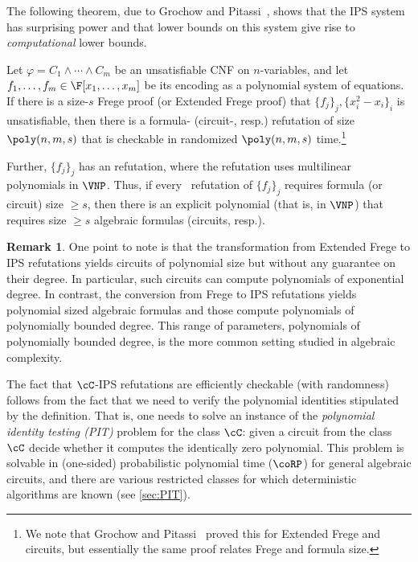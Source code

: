 \documentclass[11pt]{article}
\numberwithin{equation}{section}
\theoremstyle{definition}
\newtheorem{remark}[theorem]{Remark}
\theoremstyle{plain}
\begin{document}
The following theorem, due to Grochow and Pitassi~\cite{Pitassi97,DBLP:journals/jacm/GrochowP18}, shows that the IPS system has surprising power and that lower bounds on this system give rise to \emph{computational} lower bounds.

\begin{theoremwp}\label{thm:DBLP:journals/jacm/GrochowP18}
        Let $\varphi=C_1\wedge\cdots\wedge C_m$ be an unsatisfiable CNF on $n$-variables, and let $f_1,\ldots,f_m\in\F[x_1,\ldots,x_m]$ be its encoding as a polynomial system of equations. If there is a size-$s$ Frege proof
%
(or Extended Frege proof) %
that $\{f_j\}_j,\{x_i^2-x_i\}_i$ is unsatisfiable, then there is a formula-\lIPS
%
(circuit-\lIPS, resp.)   %
refutation of size $\poly(n,m,s)$ that is checkable in randomized $\poly(n,m,s)$ time.\footnote{We note that Grochow and Pitassi~\cite{DBLP:journals/jacm/GrochowP18} proved this for Extended Frege and circuits, but essentially the same proof relates Frege and formula size.}

        Further, $\{f_j\}_j$ has an \lIPS refutation, where the refutation uses multilinear polynomials in $\VNP$.  Thus, if every \IPS\ refutation of $\{f_j\}_j$ requires formula
%
%
(or circuit) %
 size $\ge s$, then there is an explicit polynomial (that is, in $\VNP$) that requires size $\ge s$ algebraic formulas %
(circuits, resp.).  %
\end{theoremwp}
%
%
%
%

\begin{remark}\label{rmk:EF-degree}
        One point to note is that the transformation from Extended Frege to IPS refutations yields circuits of polynomial size but without any guarantee on their degree. In particular, such circuits can compute polynomials of exponential degree. In contrast, the conversion from Frege to IPS refutations yields polynomial sized algebraic formulas and those compute polynomials of polynomially bounded degree. This range of parameters, polynomials of polynomially bounded degree, is the more common setting studied in algebraic complexity.
\end{remark}

The fact that $\cC$-IPS refutations are efficiently checkable (with randomness) follows from the fact that we need to verify the polynomial identities stipulated by the definition.  That is, one needs to solve an instance of the \emph{polynomial identity testing (PIT)} problem for the class $\cC$: given a circuit from the class $\cC$ decide whether it computes the identically zero polynomial.  This problem is solvable in (one-sided) probabilistic polynomial time ($\coRP$) for general algebraic circuits, and there are various restricted classes for which deterministic algorithms are known (see \autoref{sec:PIT}).
\end{document}
